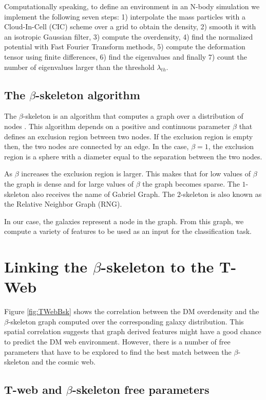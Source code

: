 \documentclass[usenatbib]{mnras}
\begin{document}
Computationally speaking, to define an environment in an N-body
simulation we implement the following seven steps: 1) interpolate the
mass particles with a Cloud-In-Cell  (CIC) scheme over a grid to
obtain the density, 2) smooth it with an isotropic Gaussian filter,
3) compute the overdensity, 4) find the normalized potential with Fast
Fourier Transform  methods, 5) compute the deformation tensor using
finite differences, 6) find the eigenvalues and finally 7) count the
number of eigenvalues larger than the threshold $\lambda_{th}$. 


\subsection{The $\beta$-skeleton algorithm}

The $\beta$-skeleton is an algorithm that computes a graph over a
distribution of nodes \citep{Kirkpatrick1985, Fang2019}.  
This algorithm depends on a positive and continuous parameter $\beta$
that defines an exclusion region between two nodes.
If the exclusion region is empty then, the two nodes are connected by an edge.  
In the case, $\beta=1$, the exclusion region is a sphere with a
diameter equal to the separation between the two nodes.  

As $\beta$ increases the exclusion region is larger.
This makes that for low values of $\beta$ the graph is dense and for
large values of $\beta$ the graph becomes sparse. 
The $1$-skeleton also receives the name of Gabriel Graph.  
The $2$-skeleton is also known as the Relative Neighbor Graph (RNG). 

In our case, the galaxies represent a node in the graph.
From this graph, we compute a variety of features to be used as an input for the classification task. 

\section{Linking the $\beta$-skeleton to the T-Web}\label{sec:link}

Figure \ref{fig:TWebBsk} shows the correlation between the DM overdensity
and the $\beta$-skeleton graph computed over the corresponding galaxy
distribution. 
This spatial correlation suggests that graph derived features might have
a good chance to predict the DM web environment. 
However, there is a number of free parameters that have to be explored
to find the best match between the $\beta$-skeleton and the cosmic web.

\subsection{T-web and $\beta$-skeleton free parameters}
\end{document}
